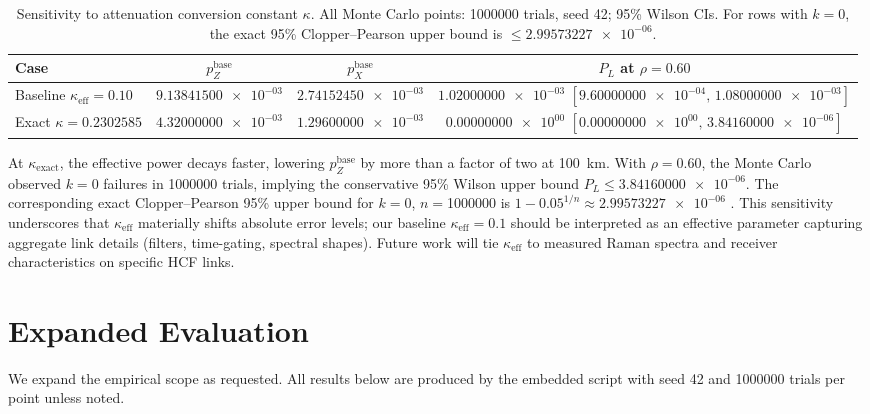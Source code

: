 \documentclass[conference]{IEEEtran}
\newcommand{\nexact}[1]{\num[round-mode=off]{#1}}
\newcommand{\simtrials}{1000000}
\newcommand{\simseed}{42}
\newcommand{\simpz}{9.13841500e-03}
\newcommand{\simpx}{2.74152450e-03}
\newcommand{\simrhoB}{0.60}
\newcommand{\simpLB}{1.02000000e-03}
\newcommand{\simpLBlo}{9.60000000e-04}
\newcommand{\simpLBhi}{1.08000000e-03}
\newcommand{\simkappaExact}{0.2302585}
\newcommand{\simpzExact}{4.32000000e-03}
\newcommand{\simpxExact}{1.29600000e-03}
\newcommand{\simpLExact}{0.00000000e+00}
\newcommand{\simpLExactlo}{0.00000000e+00}
\newcommand{\simpLExacthi}{3.84160000e-06}
\newcommand{\simkExact}{0}
\newcommand{\simCPUpperZero}{2.99573227e-06}
\begin{document}
\begin{table}[t!]
\small
\centering
\caption{Sensitivity to attenuation conversion constant \(\kappa\). All Monte Carlo points: \simtrials{} trials, seed \simseed; 95\% Wilson CIs. For rows with \(k=0\), the exact 95\% Clopper--Pearson upper bound is \(\le\nexact{\simCPUpperZero}\).}
\label{tab:kappa}
\begin{adjustbox}{width=\linewidth}
\begin{tabular}{lccc}
\toprule
Case & \(p_Z^{\text{base}}\) & \(p_X^{\text{base}}\) & \(P_L\) at \(\rho=\simrhoB\) \\
\midrule
Baseline \(\kappa_{\mathrm{eff}}=0.10\) & \(\nexact{\simpz}\) & \(\nexact{\simpx}\) & \(\nexact{\simpLB}\) \([\nexact{\simpLBlo},\,\nexact{\simpLBhi}]\) \\
Exact \(\kappa=\nexact{\simkappaExact}\) & \(\nexact{\simpzExact}\) & \(\nexact{\simpxExact}\) & \(\nexact{\simpLExact}\) \([\nexact{\simpLExactlo},\,\nexact{\simpLExacthi}]\) \\
\bottomrule
\end{tabular}
\end{adjustbox}
\end{table}

At \(\kappa_\mathrm{exact}\), the effective power decays faster, lowering \(p_Z^{\text{base}}\) by more than a factor of two at \SI{100}{\kilo\meter}. With \(\rho=\simrhoB\), the Monte Carlo observed \(k=\simkExact\) failures in \simtrials{} trials, implying the conservative 95\% Wilson upper bound \(P_L\le\nexact{\simpLExacthi}\). The corresponding exact Clopper--Pearson 95\% upper bound for \(k=0\), \(n=\)\simtrials{} is \(1-0.05^{1/n}\approx \nexact{\simCPUpperZero}\) \cite{ClopperPearson1934Biometrika}. This sensitivity underscores that \(\kappa_{\mathrm{eff}}\) materially shifts absolute error levels; our baseline \(\kappa_{\mathrm{eff}}=0.1\) should be interpreted as an effective parameter capturing aggregate link details (filters, time-gating, spectral shapes). Future work will tie \(\kappa_{\mathrm{eff}}\) to measured Raman spectra and receiver characteristics on specific HCF links.

\section{Expanded Evaluation}\label{sec:expanded}
We expand the empirical scope as requested. All results below are produced by the embedded script with seed \simseed{} and \simtrials{} trials per point unless noted.
\end{document}
